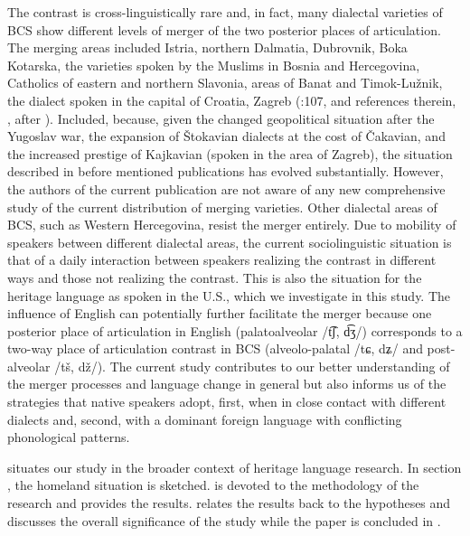 \documentclass[output=paper,modfonts,newtxmath,hidelinks,]{langscibook}
\begin{document}
The contrast is cross-linguistically rare and, in fact, many dialectal varieties of BCS show different levels of merger of the two posterior places of articulation. The merging areas included Istria, northern Dalmatia, Dubrovnik, Boka Kotarska, the varieties spoken by the Muslims in Bosnia and Hercegovina, Catholics of eastern and northern Slavonia, areas of Banat and Timok-Lužnik, the dialect spoken in the capital of Croatia, Zagreb (\citealt{Stankiewicz1986}:107, and references therein, \citealt[296]{Ivic1958}, \citealt{Zygis2003} after \citealt{Ivic1958}). Included, because, given the changed geopolitical situation after the Yugoslav war, the expansion of Štokavian dialects at the cost of Čakavian, and the increased prestige of Kajkavian (spoken in the area of Zagreb), the situation described in before mentioned publications has evolved substantially. However, the authors of the current publication are not aware of any new comprehensive study of the current distribution of merging varieties. Other dialectal areas of BCS, such as Western Hercegovina, resist the merger entirely. Due to mobility of speakers between different dialectal areas, the current sociolinguistic situation is that of a daily interaction between speakers realizing the contrast in different ways and those not realizing the contrast. This is also the situation for the heritage language as spoken in the U.S., which we investigate in this study. The influence of English can potentially further facilitate the merger because one posterior place of articulation in English (palatoalveolar /t͡ʃ, d͡ʒ/) corresponds to a two-way place of articulation contrast in BCS (alveolo-palatal /tɕ, dʑ/ and post-alveolar /tš, dž/). The current study contributes to our better understanding of the merger processes and language change in general but also informs us of the strategies that native speakers adopt, first, when in close contact with different dialects and, second, with a dominant foreign language with conflicting phonological patterns.



 situates our study in the broader context of heritage language research. 
In section , the homeland situation is sketched.  is devoted to the methodology of the research and  provides the results. 
 relates the results back to the hypotheses and discusses the overall significance of the study while the paper is concluded in .
\end{document}
